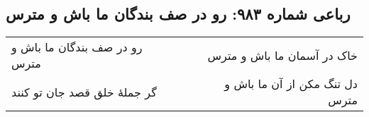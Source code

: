 \begin{center}
\section*{رباعی شماره ۹۸۳: رو در صف بندگان ما باش و مترس}
\label{sec:0983}
\begin{longtable}{l p{0.5cm} r}
رو در صف بندگان ما باش و مترس
&&
خاک در آسمان ما باش و مترس
\\
گر جملهٔ خلق قصد جان تو کنند
&&
دل تنگ مکن از آن ما باش و مترس
\\
\end{longtable}
\end{center}
